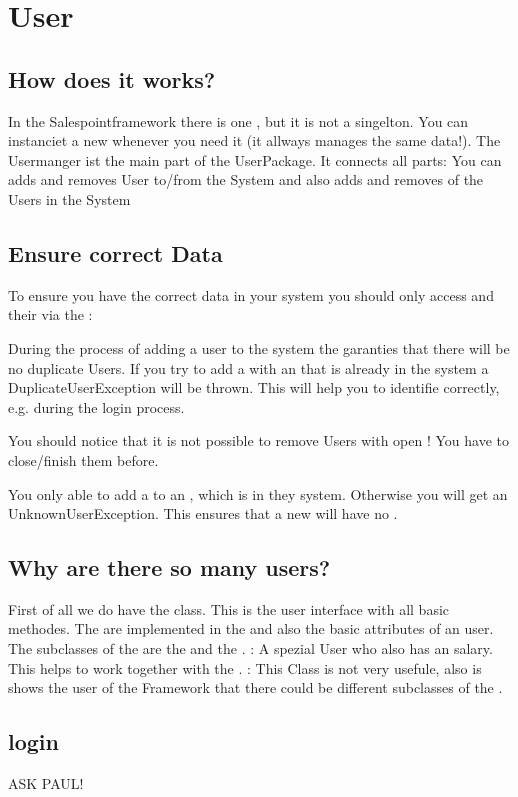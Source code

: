 \section{User}

\subsection{How does it works?}

In the Salespointframework there is one , but it is not a singelton. You can instanciet a new
 whenever you need it (it allways manages the same data!).
The Usermanger ist the main part of the UserPackage. It connects all parts:
You can adds and removes User to/from the System and also adds and removes  of the Users in the System

\subsection{Ensure correct Data}
To ensure you have the correct data in your system you should only access  and their  via the :

During the process of adding a user to the system the  garanties that there will be no duplicate Users. If you try to add a  with an  that is already in the system a DuplicateUserException will be thrown. This will help you to identifie  correctly, e.g. during the login process.

You should notice that it is not possible to remove Users with open ! You have to close/finish them before.

You only able to add a  to an , which is in they system. Otherwise you will get an UnknownUserException.
This ensures that a new  will have no .

\subsection{Why are there so many users?}
First of all we do have the  class. This is the user interface with all basic methodes. The are implemented in the
 and also the basic attributes of an user.
The subclasses of the  are the  and the .
: A spezial User who also has an salary. This helps to work together with the .
: This Class is not very usefule, also is shows the user of the Framework that there could be different subclasses of the .


\subsection{login}

ASK PAUL!





